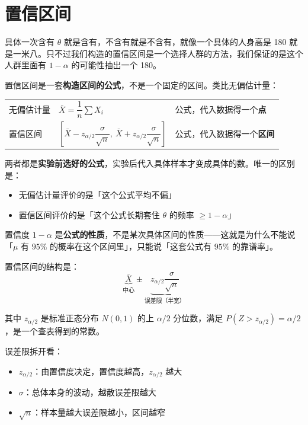 \section{置信区间}
\begin{dxtips}
具体一次含有 $\theta$ 就是含有，不含有就是不含有，就像一个具体的人身高是 180 就是一米八。只不过我们构造的置信区间是一个选择人群的方法，我们保证的是这个人群里面有 $1-\alpha$ 的可能性抽出一个 180。
\end{dxtips}
\begin{note}
置信区间是一套\textbf{构造区间的公式}，不是一个固定的区间。类比无偏估计量：

\begin{center}
\begin{tabular}{lll}
无偏估计量 & $\bar{X} = \dfrac{1}{n}\sum X_i$ & 公式，代入数据得一个\textbf{点} \\[10pt]
置信区间   & $\left[\bar{X} - z_{\alpha/2}\dfrac{\sigma}{\sqrt{n}},\ \bar{X} + z_{\alpha/2}\dfrac{\sigma}{\sqrt{n}}\right]$ & 公式，代入数据得一个\textbf{区间}
\end{tabular}
\end{center}

两者都是\textbf{实验前选好的公式}，实验后代入具体样本才变成具体的数。唯一的区别是：
\begin{itemize}
  \item 无偏估计量评价的是「这个公式平均不偏」
  \item 置信区间评价的是「这个公式长期套住 $\theta$ 的频率 $\geq 1-\alpha$」
\end{itemize}
\end{note}

\begin{dxtips}
置信度 $1-\alpha$ 是\textbf{公式的性质}，不是某次具体区间的性质——这就是为什么不能说「$\mu$ 有 $95\%$ 的概率在这个区间里」，只能说「这套公式有 $95\%$ 的靠谱率」。
\end{dxtips}
\begin{note}
置信区间的结构是：
$$\underbrace{\bar{X}}_{\text{中心}} \pm \underbrace{z_{\alpha/2}\dfrac{\sigma}{\sqrt{n}}}_{\text{误差限（半宽）}}$$

其中 $z_{\alpha/2}$ 是标准正态分布 $N(0,1)$ 的上 $\alpha/2$ 分位数，满足
$P(Z > z_{\alpha/2}) = \alpha/2$，是一个查表得到的常数。

误差限拆开看：
\begin{itemize}
  \item $z_{\alpha/2}$：由置信度决定，置信度越高，$z_{\alpha/2}$ 越大
  \item $\sigma$：总体本身的波动，越散误差限越大
  \item $\sqrt{n}$：样本量越大误差限越小，区间越窄
\end{itemize}
\end{note}

